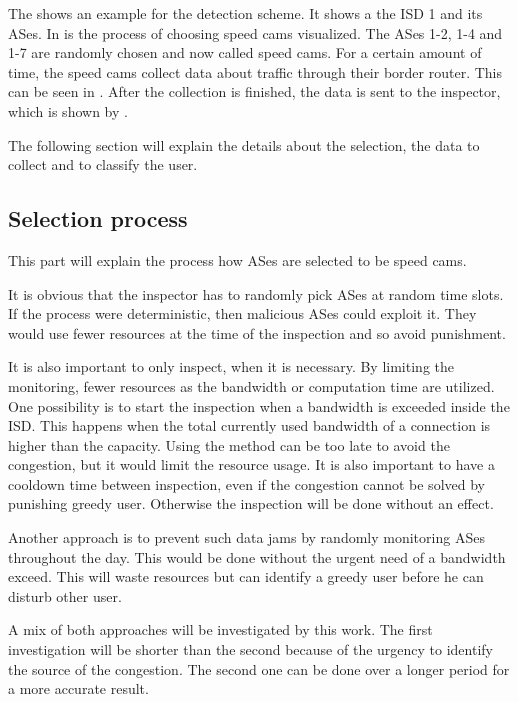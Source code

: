 \documentclass[thesis.tex]{subfiles}
\begin{document}
The  shows an example for the detection scheme. It shows a the ISD 1 and its ASes. In  is the process of choosing speed cams visualized. The ASes 1-2, 1-4 and 1-7 are randomly chosen and now called speed cams. For a certain amount of time, the speed cams collect data about traffic through their border router. This can be seen in . After the collection is finished, the data is sent to the inspector, which is shown by .

The following section will explain the details about the selection, the data to collect and to classify the user.

\subsection{Selection process}
This part will explain the process how ASes are selected to be speed cams.

It is obvious that the inspector has to randomly pick ASes at random time slots. If the process were deterministic, then malicious ASes could exploit it. They would use fewer resources at the time of the inspection and so avoid punishment.

It is also important to only inspect, when it is necessary. By limiting the monitoring, fewer resources as the bandwidth or computation time are utilized. One possibility is to start the inspection when a bandwidth is exceeded inside the ISD. This happens when the total currently used bandwidth of a connection is higher than the capacity. Using the method can be too late to avoid the congestion, but it would limit the resource usage. 
It is also important to have a cooldown time between inspection, even if the congestion cannot be solved by punishing greedy user. Otherwise the inspection will be done without an effect.


Another approach is to prevent such data jams by randomly monitoring ASes throughout the day. This would be done without the urgent need of a bandwidth exceed. This will waste resources but can identify a greedy user before he can disturb other user. 

A mix of both approaches will be investigated by this work. The first investigation will be shorter than the second because of the urgency to identify the source of the congestion. The second one can be done over a longer period for a more accurate result.
\end{document}
